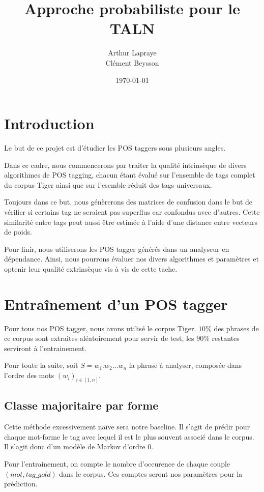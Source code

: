 \documentclass{article}
\title{Approche probabiliste pour le TALN}
\author{Arthur Lapraye\\Clément Beysson}
\date{\today}
\begin{document}
\maketitle
\tableofcontents
\newpage
\section{Introduction}
Le but de ce projet est d'étudier les POS taggers sous plusieurs angles.

Dans ce cadre, nous commencerons par traiter la qualité intrinsèque de divers algorithmes de POS tagging, chacun étant évalué sur l'ensemble de tags complet du corpus Tiger ainsi que sur l'esemble réduit des tags universaux.

Toujours dans ce but, nous génèrerons des matrices de confusion dans le but de vérifier si certains tag ne seraient pas superflus car confondus avec d'autres. Cette similarité entre tags peut aussi être estimée à l'aide d'une distance entre vecteurs de poids.

Pour finir, nous utiliserons les POS tagger générés dans un analyseur en dépendance. Ainsi, nous pourrons évaluer nos divers algorithmes et paramètres et optenir leur qualité extrinsèque vis à vis de cette tache.

\section{Entraînement d'un POS tagger}

Pour tous nos POS tagger, nous avons utilisé le corpus Tiger. $10\%$ des phrases de ce corpus sont extraites aléatoirement pour servir de test, les $90\%$ restantes serviront à l'entrainement.

Pour toute la suite, soit $S = w_1.w_2...w_n$ la phrase à analyser, composée dans l'ordre des mots $(w_i)_{i\in[1,n]}$.

\subsection{Classe majoritaire par forme}

Cette méthode excessivement naïve sera notre baseline. Il s'agit de prédir pour chaque mot-forme le tag avec lequel il est le plus souvent associé dans le corpus. Il s'agit donc d'un modèle de Markov d'ordre 0.

Pour l'entrainement, on compte le nombre d'occurence de chaque couple $(mot,tag\_gold)$ dans le corpus. Ces comptes seront nos paramètres pour la prédiction.
\end{document}
